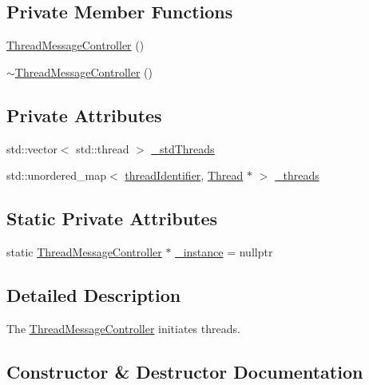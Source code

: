 \subsection*{Private Member Functions}
\begin{DoxyCompactItemize}
\item 
\hyperlink{class_m_p_e_1_1_thread_message_controller_a6b8fea7b68af1cf62b5e3b9c40f7bb8e}{Thread\+Message\+Controller} ()
\item 
\hyperlink{class_m_p_e_1_1_thread_message_controller_a4886e82640bad9363f5fcf9914b66789}{$\sim$\+Thread\+Message\+Controller} ()
\end{DoxyCompactItemize}
\subsection*{Private Attributes}
\begin{DoxyCompactItemize}
\item 
std\+::vector$<$ std\+::thread $>$ \hyperlink{class_m_p_e_1_1_thread_message_controller_a23b7a7dc72ced66080f70165359ea3b4}{\+\_\+std\+Threads}
\item 
std\+::unordered\+\_\+map$<$ \hyperlink{namespace_m_p_e_a16447295e3105bd2ba2a9ea303566175}{thread\+Identifier}, \hyperlink{class_m_p_e_1_1_thread}{Thread} $\ast$ $>$ \hyperlink{class_m_p_e_1_1_thread_message_controller_ac93b25a09aeba30cfb4bbad12967f799}{\+\_\+threads}
\end{DoxyCompactItemize}
\subsection*{Static Private Attributes}
\begin{DoxyCompactItemize}
\item 
static \hyperlink{class_m_p_e_1_1_thread_message_controller}{Thread\+Message\+Controller} $\ast$ \hyperlink{class_m_p_e_1_1_thread_message_controller_adcb1e8be3a49290adaf51d71b4eee0fc}{\+\_\+instance} = nullptr
\end{DoxyCompactItemize}


\subsection{Detailed Description}
The \hyperlink{class_m_p_e_1_1_thread_message_controller}{Thread\+Message\+Controller} initiates threads. 

\subsection{Constructor \& Destructor Documentation}
\mbox{\label{class_m_p_e_1_1_thread_message_controller_a6b8fea7b68af1cf62b5e3b9c40f7bb8e}} 
